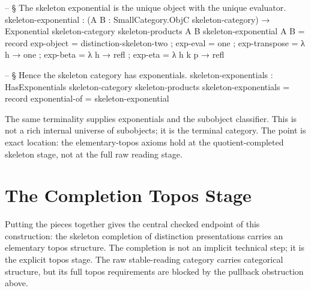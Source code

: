 \documentclass[11pt]{article}
\begin{document}
\begin{code}
-- § The skeleton exponential is the unique object with the unique evaluator.
skeleton-exponential :
  (A B : SmallCategory.ObjC skeleton-category) →
  Exponential skeleton-category skeleton-products A B
skeleton-exponential A B = record
  { exp-object    = distinction-skeleton-two
  ; exp-eval      = one
  ; exp-transpose = λ h → one
  ; exp-beta      = λ h → refl
  ; exp-eta       = λ h k p → refl
  }

-- § Hence the skeleton category has exponentials.
skeleton-exponentials : HasExponentials skeleton-category skeleton-products
skeleton-exponentials = record
  { exponential-of = skeleton-exponential
  }
\end{code}

The same terminality supplies exponentials and the subobject classifier.
This is not a rich internal universe of subobjects; it is the terminal
category.  The point is exact location: the elementary-topos axioms hold
at the quotient-completed skeleton stage, not at the full raw reading
stage.

\section{The Completion Topos Stage}

Putting the pieces together gives the central checked endpoint of this
construction: the skeleton completion of distinction presentations
carries an elementary topos structure.  The completion is not an
implicit technical step; it is the explicit topos stage.  The raw
stable-reading category carries categorical structure, but its full
topos requirements are blocked by the pullback obstruction above.

\begin{center}
\end{center}
\end{document}
